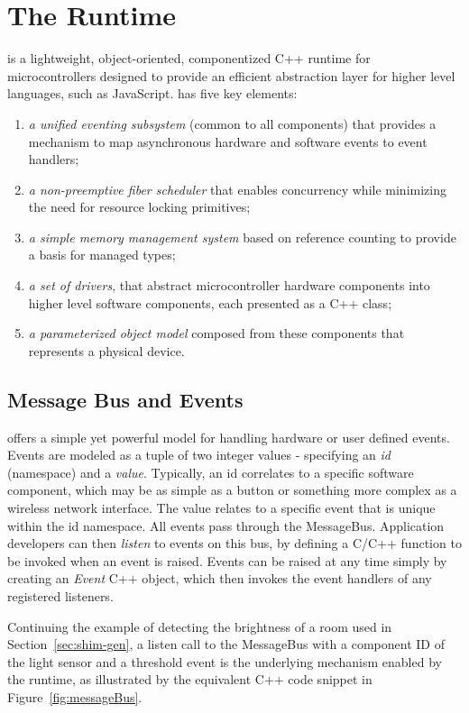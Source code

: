 \section{The \CO Runtime}
\label{sec:codal}

\CO is a lightweight, object-oriented, componentized C++ runtime for microcontrollers designed to provide an efficient abstraction layer for higher level languages, such as JavaScript. \CO has five key elements:

\begin{enumerate}
\item \emph{a unified eventing subsystem} (common to all components) that provides a mechanism to map asynchronous hardware and software events to event handlers;
\item \emph{a non-preemptive fiber scheduler} that enables concurrency while minimizing the need for resource locking primitives;
\item \emph{a simple memory management system} based on reference counting to provide a basis for managed types;
\item \emph{a set of drivers}, that abstract microcontroller hardware components into higher level software components, each presented as a C++ class;
\item \emph{a parameterized object model} composed from these components that represents a physical device.
\end{enumerate}

\subsection{Message Bus and Events}

\CO offers a simple yet powerful model for handling hardware or user defined events. Events are modeled as a tuple of two integer values - specifying an \emph{id} (namespace) and a \emph{value}.
Typically, an id correlates to a specific software component, which may be as simple as a button or something more complex as a wireless network interface. The value relates to a specific event that is unique within the id namespace. All events pass through the \CO MessageBus. Application developers can then \emph{listen} to events on this bus, by defining a C/C++ function to be invoked when an event is raised. Events can be raised at any time simply by creating an \emph{Event} C++ object, which then invokes the event handlers of any registered listeners.

Continuing the example of detecting the brightness of a room used in Section~\ref{sec:shim-gen}, a listen call to the MessageBus with a component ID of the light sensor and a threshold event is the underlying mechanism enabled by the runtime, as illustrated by the equivalent C++ code snippet in Figure~\ref{fig:messageBus}.


